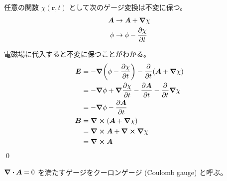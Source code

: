 \documentclass[uplatex,dvipdfmx,a4paper,11pt]{jlreq}
\makeatletter
\newcommand{\EE}{\bm{E}}
\newcommand{\BB}{\bm{B}}
\renewcommand{\AA}{\bm{A}}
\newcommand{\rr}{\bm{r}}
\theoremstyle{definition}
\renewenvironment{proof}[1][\proofname]{\par
  \normalfont
  \topsep6\p@\@plus6\p@ \trivlist
  \item[\hskip\labelsep{\bfseries #1}\@addpunct{\bfseries}]\ignorespaces\quad\par
}{%
  \qed\endtrivlist\@endpefalse
}
\renewcommand\proofname{証明}
\makeatother
\begin{document}
\begin{theorem}[ゲージ変換]
  任意の関数 $\chi(\rr, t)$ として次のゲージ変換は不変に保つ。
  \begin{align}
    \AA  & \to \AA + \vnabla\chi    \\
    \phi & \to \phi - \pdv{\chi}{t}
  \end{align}
\end{theorem}
\begin{proof}
  電磁場に代入すると不変に保つことがわかる。
  \begin{align}
    \EE & = - \vnabla\qty(\phi - \pdv{\chi}{t}) - \pdv{t}(\AA + \vnabla\chi)         \\
        & = - \vnabla\phi + \vnabla\pdv{\chi}{t} - \pdv{\AA}{t} - \pdv{t}\vnabla\chi \\
        & = - \vnabla\phi - \pdv{\AA}{t}                                             \\
    \BB & = \vnabla\cross(\AA + \vnabla\chi)                                         \\
        & = \vnabla\cross\AA + \vnabla\cross\vnabla\chi                              \\
        & = \vnabla\cross\AA
  \end{align}
\end{proof}

\begin{definition}
  $\vnabla\vdot\AA = 0$ を満たすゲージをクーロンゲージ (Coulomb gauge) と呼ぶ。
\end{definition}
\end{document}
